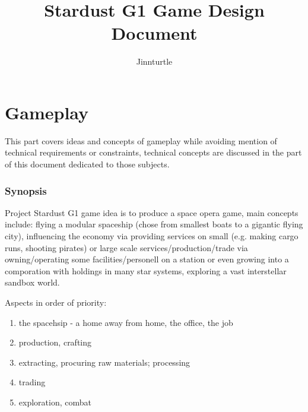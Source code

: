 \documentclass[a4paper,10pt]{article}
\begin{document}
\newlength{\tabcolsepDefault}
\setlength{\tabcolsepDefault}{\tabcolsep}




\newcommand{\textbi}[1]{\textbf{\textit{#1}}}

\newcommand{\projName}{Stardust G1}


\title{Stardust G1 Game Design Document}
\author{Jinnturtle}

\maketitle
\tableofcontents



\newpage
\part{Gameplay}

This part covers ideas and concepts of gameplay while avoiding mention of
technical requirements or constraints, technical concepts are discussed in
the part of this document dedicated to those subjects.

\section{Synopsis}
\begin{multicols}{2}
Project \projName{} game idea is to produce a space opera game, main concepts
include: flying a modular spaceship (chose from smallest boats to a gigantic
flying city), influencing the economy via providing services on small (e.g.
making cargo runs, shooting pirates) or large scale services/production/trade
via owning/operating some facilities/personell on a station or even growing into
a comporation with holdings in many star systems, exploring a vast interstellar
sandbox world.

Aspects in order of priority:
\begin{enumerate}
    \item the spacehsip - a home away from home, the office, the job
    \item production, crafting
    \item extracting, procuring raw materials; processing
    \item trading
    \item exploration, combat
\end{enumerate}

\end{multicols}
\end{document}
